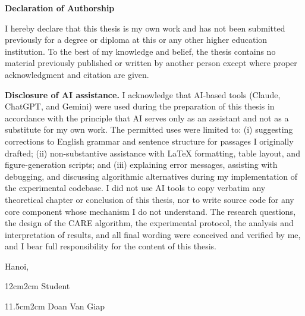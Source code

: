 \setcounter{page}{1}
{}
\begin{center}
\textbf{\large{Declaration of Authorship}}
\end{center}

I hereby declare that this thesis is my own work and has not been submitted previously for a degree or diploma at this or any other higher education institution. To the best of my knowledge and belief, the thesis contains no material previously published or written by another person except where proper acknowledgment and citation are given.

\bigskip

\noindent\textbf{Disclosure of AI assistance.} I acknowledge that AI-based tools (Claude, ChatGPT, and Gemini) were used during the preparation of this thesis in accordance with the principle that AI serves only as an assistant and not as a substitute for my own work. The permitted uses were limited to: (i) suggesting corrections to English grammar and sentence structure for passages I originally drafted; (ii) non-substantive assistance with \LaTeX{} formatting, table layout, and figure-generation scripts; and (iii) explaining error messages, assisting with debugging, and discussing algorithmic alternatives during my implementation of the experimental codebase. I did not use AI tools to copy verbatim any theoretical chapter or conclusion of this thesis, nor to write source code for any core component whose mechanism I do not understand. The research questions, the design of the CARE algorithm, the experimental protocol, the analysis and interpretation of results, and all final wording were conceived and verified by me, and I bear full responsibility for the content of this thesis.

\begin{flushright}
Hanoi, \dotfill
\end{flushright}

\begin{changemargin}{12cm}{2cm}
Student
\\[2cm]
\end{changemargin}

\begin{changemargin}{11.5cm}{2cm}
Doan Van Giap
\end{changemargin}
